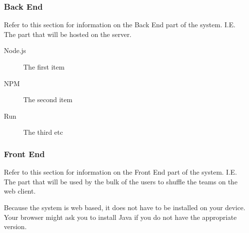 \subsubsection{Back End}
	Refer to this section for information on the Back End part of the system. I.E. The part that will be hosted on the server.\par
	\vspace{0.3cm}
	
\begin{description} 
\item[Node.js] The first item 
\item[NPM] The second item 
\item[Run] The third etc
\end{description}

\subsubsection{Front End}
	Refer to this section for information on the Front End part of the system. I.E. The part that will be 	used by the bulk of the users to shuffle the teams on the web client.\par
	\vspace{0.3cm}
	
Because the system is web based, it does not have to be installed on your device. 
Your browser might ask you to install Java if you do not have the appropriate version.